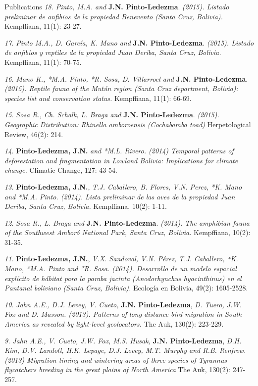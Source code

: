 \documentclass{resume} %
\begin{document}
\begin{rSection}{Publications}
{\em 18.} {\em *Pinto, M.A. and} {\bf{J.N. Pinto-Ledezma}}. {\em (2015). Listado preliminar de anfibios de la propiedad Benevento (Santa Cruz, Bolivia).} {Kempffiana, 11(1): 23-27}.

{\em 17.} {\em *Pinto M.A., D. García, K. Mano and} {\bf{J.N. Pinto-Ledezma}}. {\em (2015). Listado de anfibios y reptiles de la propiedad Juan Deriba, Santa Cruz, Bolivia.} {Kempffiana, 11(1): 70-75}.

{\em 16.} {\em *Mano K., *M.A. Pinto, *R. Sosa, D. Villarroel and} {\bf{J.N. Pinto-Ledezma}}. {\em (2015). Reptile fauna of the Mutún region (Santa Cruz department, Bolivia): species list and conservation status.} {Kempffiana, 11(1): 66-69}.

{\em 15.} {\em *Sosa R., Ch. Schalk, L. Braga and} {\bf{J.N. Pinto-Ledezma}}. {\em (2015). Geographic Distribution: {\em Rhinella amboroensis} (Cochabamba toad)} {Herpetological Review, 46(2): 214}.

{\em 14.} {\bf{Pinto-Ledezma, J.N.}} {\em and *M.L. Rivero. (2014) Temporal patterns of deforestation and fragmentation in Lowland Bolivia: Implications for climate change.} {Climatic Change, 127: 43-54}. 

{\em 13.} {\bf{Pinto-Ledezma, J.N.}}, {\em T.J. Caballero, B. Flores, V.N. Perez, *K. Mano and *M.A. Pinto. (2014). Lista preliminar de las aves de la propiedad Juan Deriba, Santa Cruz, Bolivia.} {Kempffiana, 10(2): 1-11}.

{\em 12.} {\em *Sosa R., L. Braga and} {\bf{J.N. Pinto-Ledezma}}. {\em (2014). The amphibian fauna of the Southwest Amboró National Park, Santa Cruz, Bolivia.} {Kempffiana, 10(2): 31-35}.

{\em 11.} {\bf{Pinto-Ledezma, J.N.}}, {\em V.X. Sandoval, V.N. Pérez, T.J. Caballero, *K. Mano, *M.A. Pinto and *R. Sosa. (2014). Desarrollo de un modelo espacial explícito de hábitat para la paraba jacinta ({\em Anodorhynchus hyacinthinus}) en el Pantanal boliviano (Santa Cruz, Bolivia). } {Ecología en Bolivia, 49(2): 1605-2528}.

{\em 10.} {\em Jahn A.E., D.J. Levey, V. Cueto,} {\bf{J.N. Pinto-Ledezma}}, {\em D. Tuero, J.W. Fox and D. Masson. (2013). Patterns of long-distance bird migration in South America as revealed by light-level geolocators.} {The Auk, 130(2): 223-229}. 

{\em 9.} {\em Jahn A.E., V. Cueto, J.W. Fox, M.S. Husak,} {\bf{J.N. Pinto-Ledezma}}, {\em D.H. Kim, D.V. Landoll, H.K. Lepage, D.J. Levey, M.T. Murphy and R.B. Renfrew. (2013) Migration timing and wintering areas of three species of Tyrannus flycatchers breeding in the great plains of North America} {The Auk, 130(2): 247-257}. 


\end{rSection}
\end{document}

